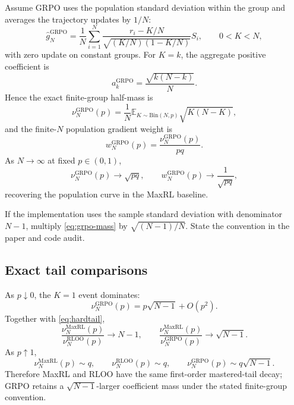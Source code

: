 \documentclass[11pt]{article}
\newcommand{\E}{\mathbb{E}}
\theoremstyle{definition}
\theoremstyle{remark}
\begin{document}
Assume GRPO uses the population standard deviation within the group and averages the trajectory updates by $1/N$:
\begin{equation}
\widehat g_N^{\mathrm{GRPO}}
=\frac1N\sum_{i=1}^{N}
\frac{r_i-K/N}{\sqrt{(K/N)(1-K/N)}}S_i,
\qquad 0<K<N,
\label{eq:grpo}
\end{equation}
with zero update on constant groups. For $K=k$, the aggregate positive coefficient is
\begin{equation}
 a_k^{\mathrm{GRPO}}=\frac{\sqrt{k(N-k)}}{N}.
\end{equation}
Hence the exact finite-group half-mass is
\begin{equation}
\nu_N^{\mathrm{GRPO}}(p)
=\frac1N\E_{K\sim\mathrm{Bin}(N,p)}\sqrt{K(N-K)},
\label{eq:grpo-mass}
\end{equation}
and the finite-$N$ population gradient weight is
\begin{equation}
 w_N^{\mathrm{GRPO}}(p)
=\frac{\nu_N^{\mathrm{GRPO}}(p)}{pq}.
\label{eq:grpo-weight-finite}
\end{equation}
As $N\to\infty$ at fixed $p\in(0,1)$,
\[
\nu_N^{\mathrm{GRPO}}(p)\to\sqrt{pq},
\qquad
w_N^{\mathrm{GRPO}}(p)\to\frac1{\sqrt{pq}},
\]
recovering the population curve in the MaxRL baseline.

If the implementation uses the sample standard deviation with denominator $N-1$, multiply \cref{eq:grpo-mass} by $\sqrt{(N-1)/N}$. State the convention in the paper and code audit.

\subsection{Exact tail comparisons}

As $p\downarrow0$, the $K=1$ event dominates:
\begin{equation}
\nu_N^{\mathrm{GRPO}}(p)
=p\sqrt{N-1}+O(p^2).
\end{equation}
Together with \cref{eq:hardtail},
\begin{equation}
\frac{\nu_N^{\mathrm{MaxRL}}(p)}{\nu_N^{\mathrm{RLOO}}(p)}\to N-1,
\qquad
\frac{\nu_N^{\mathrm{MaxRL}}(p)}{\nu_N^{\mathrm{GRPO}}(p)}\to\sqrt{N-1}.
\label{eq:hard-ratios}
\end{equation}
As $p\uparrow1$,
\begin{equation}
\nu_N^{\mathrm{MaxRL}}(p)\sim q,
\qquad
\nu_N^{\mathrm{RLOO}}(p)\sim q,
\qquad
\nu_N^{\mathrm{GRPO}}(p)\sim q\sqrt{N-1}.
\label{eq:easy-ratios}
\end{equation}
Therefore MaxRL and RLOO have the same first-order mastered-tail decay; GRPO retains a $\sqrt{N-1}$-larger coefficient mass under the stated finite-group convention.
\end{document}

